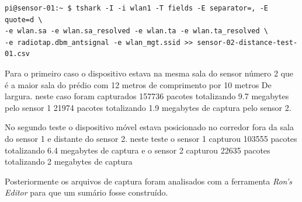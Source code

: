 \begin{lstlisting}
pi@sensor-01:~ $ tshark -I -i wlan1 -T fields -E separator=, -E quote=d \
-e wlan.sa -e wlan.sa_resolved -e wlan.ta -e wlan.ta_resolved \
-e radiotap.dbm_antsignal -e wlan_mgt.ssid >> sensor-02-distance-test-01.csv
\end{lstlisting}

Para o primeiro caso o dispositivo estava na mesma sala do sensor número 2 que é a maior
sala do prédio com 12  metros de comprimento por 10 metros  De largura. neste caso foram
capturados 157736 pacotes totalizando 9.7 megabytes pelo sensor 1 21974 pacotes totalizando
1.9 megabytes de captura pelo sensor 2.

No segundo teste o dispositivo móvel estava posicionado no corredor fora da sala do sensor 1
e distante do sensor 2.  neste teste o sensor 1 capturou 103555 pacotes totalizando 6.4 megabytes
de captura e o sensor 2 capturou 22635 pacotes totalizando 2 megabytes de captura

Posteriormente os arquivos de captura foram analisados com a ferramenta
\emph{Ron’s Editor} para que um sumário fosse construído.


